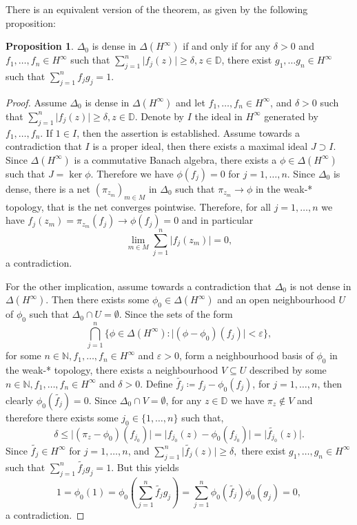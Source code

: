 \documentclass[letterpaper, 11pt]{article}
\newcommand{\D}{\mathbb{D}}
\newcommand{\N}{\mathbb{N}}
\newcommand{\1}{\mathds{1}}
\theoremstyle{definition}
\newtheorem{proposition}[theorem]{Proposition}
\begin{document}
There is an equivalent version of the theorem, as given by the following proposition:

\begin{proposition} \label{prop:corona-equiv}
  $\Delta_0$ is dense in $\Delta(H^\infty)$ if and only if for any $\delta > 0$ and $f_1, \dots, f_n \in H^\infty$ such that $\sum_{j=1}^n \vert f_j(z) \vert \geq \delta, z \in \D$, there exist $g_1, \dots g_n \in H^\infty$ such that $\sum_{j=1}^n f_j g_j = 1$.
\end{proposition}

\begin{proof}
  Assume $\Delta_0$ is dense in $\Delta(H^\infty)$ and let $f_1, \dots, f_n \in H^\infty$, and $\delta > 0$ such that $\sum_{j=1}^n \vert f_j(z) \vert \geq \delta, z \in \D$. Denote by $I$ the ideal in $H^\infty$ generated by $f_1, \dots, f_n$. If $1 \in I$, then the assertion is established. Assume towards a contradiction that $I$ is a proper ideal, then there exists a maximal ideal $J \supset I$. Since $\Delta(H^\infty)$ is a commutative Banach algebra, there exists a $\phi \in \Delta(H^\infty)$ such that $J = \ker \phi$. Therefore we have $\phi(f_j) = 0$ for $j=1,\dots,n$. Since $\Delta_0$ is dense, there is a net $(\pi_{z_m})_{m \in M}$ in $\Delta_0$ such that $\pi_{z_m} \to \phi$ in the weak\nobreakdash-* topology, that is the net converges pointwise. Therefore, for all $j=1,\dots,n$ we have $f_j(z_m) = \pi_{z_m}(f_j) \to \phi(f_j) = 0$ and in particular
  $$ \lim_{m \in M} \sum_{j=1}^n \vert f_j(z_m) \vert = 0, $$
  a contradiction.

  For the other implication, assume towards a contradiction that $\Delta_0$ is not dense in $\Delta(H^\infty)$. Then there exists some $\phi_0 \in \Delta(H^\infty)$ and an open neighbourhood $U$ of $\phi_0$ such that $\Delta_0 \cap U = \emptyset$. Since the sets of the form
  $$ \bigcap_{j=1}^n \{ \phi \in \Delta(H^\infty) : \vert (\phi - \phi_0)(f_j) \vert < \varepsilon \}, $$
  for some $n \in \N, f_1, \dots, f_n \in H^\infty$ and $\varepsilon > 0$, form a neighbourhood basis of $\phi_0$ in the weak\nobreakdash-* topology, there exists a neighbourhood $V \subseteq U$ described by some $n \in \N, f_1, \dots, f_n \in H^\infty$ and $\delta > 0$. Define $\widetilde{f_j} \coloneqq f_j - \phi_0(f_j)$, for $j=1,\dots,n$, then clearly $\phi_0(\widetilde{f_j}) = 0$. Since $\Delta_0 \cap V = \emptyset$, for any $z \in \D$ we have $\pi_z \notin V$ and therefore there exists some $j_0 \in \{ 1, \dots, n \}$ such that,
  $$ \delta \leq \vert (\pi_z - \phi_0)(f_{j_0}) \vert = \vert f_{j_0}(z) - \phi_0(f_{j_0}) \vert = \vert \widetilde{f_{j_0}}(z) \vert. $$
  Since $\widetilde{f_j} \in H^\infty$ for $j=1,\dots,n$, and $ \sum_{j=1}^n \vert \widetilde{f_j}(z) \vert \geq \delta, $ there exist $g_1, \dots, g_n \in H^\infty$ such that $\sum_{j=1}^n \widetilde{f_j} g_j = 1$. But this yields
  $$ 1 = \phi_0(1) = \phi_0 \left( \sum_{j=1}^n \widetilde{f_j} g_j \right) = \sum_{j=1}^n \phi_0(\widetilde{f_j}) \phi_0(g_j) = 0, $$
  a contradiction.
\end{proof}
\end{document}
